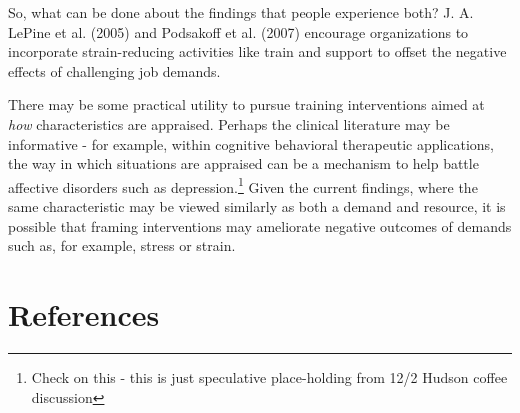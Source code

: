 \documentclass[
  man]{apa6}
\begin{document}
So, what can be done about the findings that people experience both? J. A. LePine et al. (2005) and Podsakoff et al. (2007) encourage organizations to incorporate strain-reducing activities like train and support to offset the negative effects of challenging job demands.

There may be some practical utility to pursue training interventions aimed at \emph{how} characteristics are appraised. Perhaps the clinical literature may be informative - for example, within cognitive behavioral therapeutic applications, the way in which situations are appraised can be a mechanism to help battle affective disorders such as depression.\footnote{Check on this - this is just speculative place-holding from 12/2 Hudson coffee discussion} Given the current findings, where the same characteristic may be viewed similarly as both a demand and resource, it is possible that framing interventions may ameliorate negative outcomes of demands such as, for example, stress or strain.

\newpage

\hypertarget{references}{%
\section{References}\label{references}}

\begingroup
\setlength{\parindent}{-0.5in}
\setlength{\leftskip}{0.5in}
\end{document}
